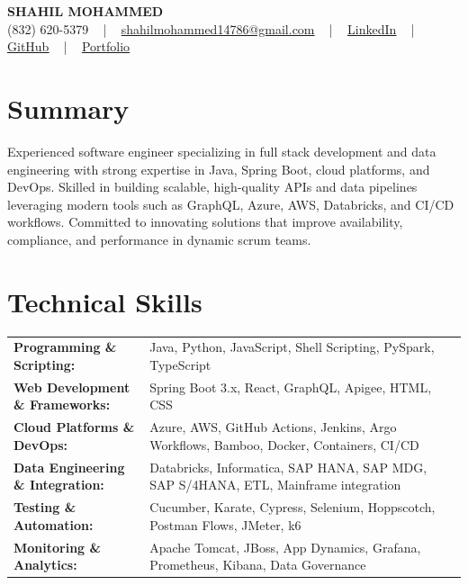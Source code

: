 \documentclass[letterpaper,11pt]{article}
\begin{document}
\begin{center}
    {\fontsize{14pt}{12pt}\selectfont \textbf{\MakeUppercase{Shahil Mohammed}}}\\ \vspace{2pt}
    \fontsize{10pt}{12pt}\selectfont (832) 620-5379 ~ | ~ \href{mailto:shahilmohammed14786@gmail.com}{shahilmohammed14786@gmail.com} ~ | ~  
    \href{https://www.linkedin.com/in/shahil-mohammed-9652931a1/}{\color{blue}\underline{LinkedIn}}  ~ | ~ 
    \href{https://github.com/freakbeast14}{\color{blue}\underline{GitHub}} ~ | ~ 
    \href{https://shahil-mohammed.netlify.app/}{\color{blue}\underline{Portfolio}}
    \vspace{-8pt}
\end{center}

\section{Summary}
\fontsize{9pt}{10pt}\selectfont
Experienced software engineer specializing in full stack development and data engineering with strong expertise in Java, Spring Boot, cloud platforms, and DevOps. Skilled in building scalable, high-quality APIs and data pipelines leveraging modern tools such as GraphQL, Azure, AWS, Databricks, and CI/CD workflows. Committed to innovating solutions that improve availability, compliance, and performance in dynamic scrum teams.
 \vspace{-5pt}
 
\section{Technical Skills}
        \vspace{-14pt}
        \begin{table}[h]
            \fontsize{9pt}{10pt}\selectfont
            \begin{tabular}{p{0.3\linewidth} p{0.7\linewidth}}
                \textbf{Programming \& Scripting:} & Java, Python, JavaScript, Shell Scripting, PySpark, TypeScript \\
                \textbf{Web Development \& Frameworks:} & Spring Boot 3.x, React, GraphQL, Apigee, HTML, CSS \\
                \textbf{Cloud Platforms \& DevOps:} & Azure, AWS, GitHub Actions, Jenkins, Argo Workflows, Bamboo, Docker, Containers, CI/CD \\
                \textbf{Data Engineering \& Integration:} & Databricks, Informatica, SAP HANA, SAP MDG, SAP S/4HANA, ETL, Mainframe integration \\
                \textbf{Testing \& Automation:} & Cucumber, Karate, Cypress, Selenium, Hoppscotch, Postman Flows, JMeter, k6 \\
                \textbf{Monitoring \& Analytics:} & Apache Tomcat, JBoss, App Dynamics, Grafana, Prometheus, Kibana, Data Governance \\
            \end{tabular}
        \end{table}
 \vspace{-15pt}
 
\end{document}
